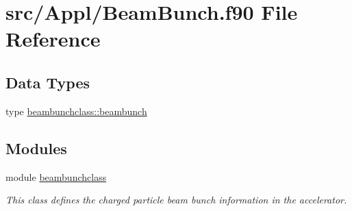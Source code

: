 \hypertarget{_beam_bunch_8f90}{}\section{src/\+Appl/\+Beam\+Bunch.f90 File Reference}
\label{_beam_bunch_8f90}
\subsection*{Data Types}
\begin{DoxyCompactItemize}
\item 
type \mbox{\hyperlink{namespacebeambunchclass_structbeambunchclass_1_1beambunch}{beambunchclass\+::beambunch}}
\end{DoxyCompactItemize}
\subsection*{Modules}
\begin{DoxyCompactItemize}
\item 
module \mbox{\hyperlink{namespacebeambunchclass}{beambunchclass}}
\begin{DoxyCompactList}\small\item\em This class defines the charged particle beam bunch information in the accelerator. \end{DoxyCompactList}\end{DoxyCompactItemize}
